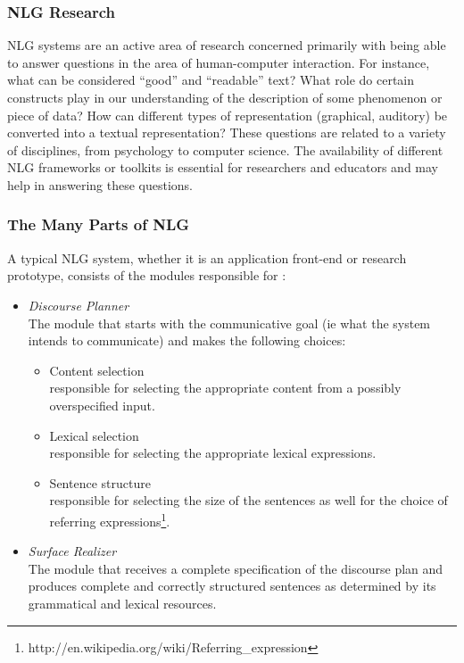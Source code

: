 \documentclass[12pt]{article}
\begin{document}
\subsubsection{NLG Research}
NLG systems are an active area of research concerned primarily with being able
to answer questions in the area of human-computer interaction. For instance, 
what can be considered ``good'' and ``readable'' text? What role do certain
constructs play in our understanding of the description of some phenomenon or piece
of data? How can different types of representation (graphical, auditory)
be converted into a textual representation? These questions are
related to a variety of disciplines, from psychology to computer science. The 
availability of different NLG frameworks or toolkits is essential for 
researchers and educators and may help in answering these
questions.


\subsubsection{The Many Parts of NLG}

A typical NLG system, whether it is an application front-end or research
prototype, consists of the modules responsible for \cite{nlp-chap19}:

\begin{itemize}
    \item \textit{Discourse Planner}\\
        The module that starts with the communicative goal
        (ie what the system intends to communicate) and makes the following choices:
        \begin{itemize}
            \item Content selection \\
                responsible for selecting the appropriate content from a possibly
                overspecified input.

            \item Lexical selection \\
                responsible for selecting the appropriate lexical expressions.

            \item Sentence structure \\
                responsible for selecting the size of the sentences as well for the choice
                of referring expressions\footnote{http://en.wikipedia.org/wiki/Referring\_expression}.
        \end{itemize}
    \item {\it Surface Realizer}\\
        The module that receives a complete specification
        of the discourse plan and produces complete and correctly structured sentences
        as determined by its grammatical and lexical resources. 
\end{itemize}
\end{document}
